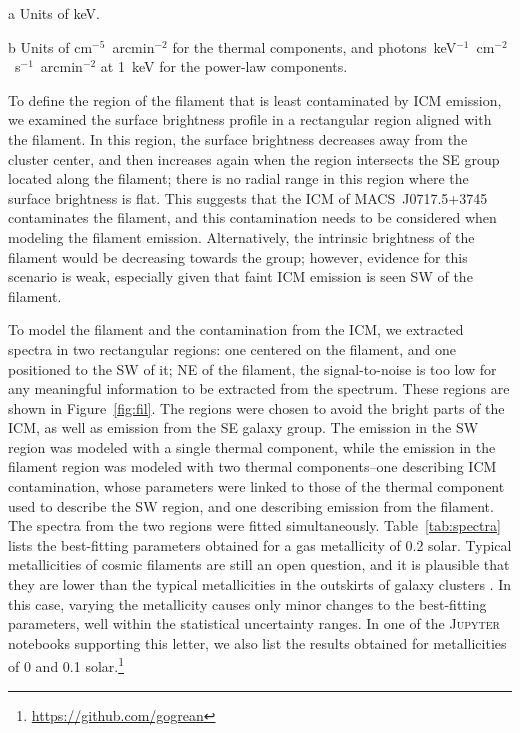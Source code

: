 \begin{table}
\begin{center}
\begin{threeparttable}
\begin{tabular}{l c c}
      \end{tabular}
      \begin{tablenotes}
              \item[a] Units of keV.
              \item[b] Units of cm$^{-5}$~arcmin$^{-2}$ for the thermal components, and photons~keV$^{-1}$~cm$^{-2}$~s$^{-1}$~arcmin$^{-2}$ at 1~keV for the power-law components.
      \end{tablenotes}
    \end{threeparttable}
  \end{center}
\end{table}

To define the region of the filament that is least contaminated by ICM emission, we examined the surface brightness profile in a rectangular region aligned with the filament. In this region, the surface brightness decreases away from the cluster center, and then increases again when the region intersects the SE group located along the filament; there is no radial range in this region where the surface brightness is flat. This suggests that the ICM of MACS~J0717.5+3745 contaminates the filament, and this contamination needs to be considered when modeling the filament emission. Alternatively, the intrinsic brightness of the filament would be decreasing towards the group; however, evidence for this scenario is weak, especially given that faint ICM emission is seen SW of the filament.

To model the filament and the contamination from the ICM, we extracted spectra in two rectangular regions: one centered on the filament, and one positioned to the SW of it; NE of the filament, the signal-to-noise is too low for any meaningful information to be extracted from the spectrum. These regions are shown in Figure~\ref{fig:fil}. The regions were chosen to avoid the bright parts of the ICM, as well as emission from the SE galaxy group. The emission in the SW region was modeled with a single thermal component, while the emission in the filament region was modeled with two thermal components--one describing ICM contamination, whose parameters were linked to those of the thermal component used to describe the SW region, and one describing emission from the filament. The spectra from the two regions were fitted simultaneously. Table~\ref{tab:spectra} lists the best-fitting parameters obtained for a gas metallicity of 0.2 solar. Typical metallicities of cosmic filaments are still an open question, and it is plausible that they are lower than the typical metallicities in the outskirts of galaxy clusters \citet[$\sim 0.2-0.3$; e.g.][]{Simionescu2015}. In this case, varying the metallicity causes only minor changes to the best-fitting parameters, well within the statistical uncertainty ranges. In one of the \textsc{Jupyter} notebooks supporting this letter, we also list the results obtained for metallicities of 0 and 0.1 solar.\footnote{\url{https://github.com/gogrean}}

